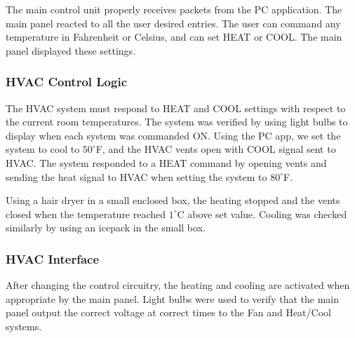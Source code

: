 The main control unit properly receives packets from the PC application.  The main panel reacted to all the user desired entries.  The user can command any temperature in Fahrenheit or Celsius, and can set HEAT or COOL.  The main panel displayed these settings.

\subsubsection{HVAC Control Logic}
The HVAC system must respond to HEAT and COOL settings with respect to the current room temperatures.  The system was verified by using light bulbs to display when each system was commanded ON.  Using the PC app, we set the system to cool to $50^\circ$F, and the HVAC vents open with COOL signal sent to HVAC.  The system responded to a HEAT command by opening vents and sending the heat signal to HVAC when setting the system to $80^\circ$F.

Using a hair dryer in a small enclosed box, the heating stopped and the vents closed when the temperature reached $1^\circ$C above set value.  Cooling was checked similarly by using an icepack in the small box.

\subsubsection{HVAC Interface}
After changing the control circuitry, the heating and cooling are activated when appropriate by the main panel.  Light bulbs were used to verify that the main panel output the correct voltage at correct times to the Fan and Heat/Cool systems.


